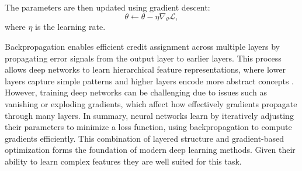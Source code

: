 The parameters are then updated using gradient descent:
\begin{equation}
    \theta \leftarrow \theta - \eta \nabla_\theta \mathcal{L},
\end{equation}
where $\eta$ is the learning rate.

Backpropagation enables efficient credit assignment across multiple layers by propagating error signals from the output layer to earlier layers. This process allows deep networks to learn hierarchical feature representations, where lower layers capture simple patterns and higher layers encode more abstract concepts \citep{Schmidhuber2015}. However, training deep networks can be challenging due to issues such as vanishing or exploding gradients, which affect how effectively gradients propagate through many layers.
In summary, neural networks learn by iteratively adjusting their parameters to minimize a loss function, using backpropagation to compute gradients efficiently. This combination of layered structure and gradient-based optimization forms the foundation of modern deep learning methods. Given their ability to learn complex features they are well suited for this task. 